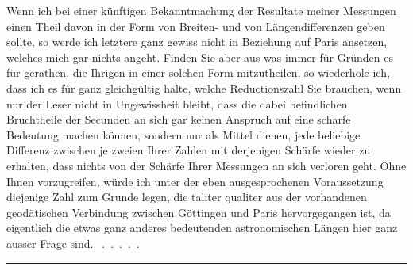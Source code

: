 \par\noindent\hspace*{\parindent}Wenn ich bei einer künftigen Bekanntmachung der Resultate meiner Messungen einen Theil davon in der Form von Breiten- und von Längendifferenzen geben sollte, so werde ich letztere ganz gewiss nicht in Beziehung auf Paris ansetzen, welches mich gar nichts angeht. Finden Sie aber aus was immer für Gründen es für gerathen, die Ihrigen in einer solchen Form mitzutheilen, so wiederhole ich, dass ich es für ganz gleichgültig halte, welche Reductionszahl Sie brauchen, wenn nur der Leser nicht in Ungewissheit bleibt, dass die dabei befindlichen Bruchtheile der Secunden an sich gar keinen Anspruch auf eine scharfe Bedeutung machen können, sondern nur als Mittel dienen, jede beliebige Differenz zwischen je zweien Ihrer Zahlen mit derjenigen Schärfe wieder zu erhalten, dass nichts von der Schärfe Ihrer Messungen an sich verloren geht. Ohne Ihnen vorzugreifen, würde ich unter der eben ausgesprochenen Voraussetzung diejenige Zahl zum Grunde legen, die taliter qualiter aus der vorhandenen geodätischen Verbindung zwischen Göttingen und Paris hervorgegangen ist, da eigentlich die etwas ganz anderes bedeutenden astronomischen Längen hier ganz ausser Frage sind.\quad\mbox{.\ .\ .\ .\ .\ .}
\begin{center}\rule{.12\linewidth}{.4pt}\end{center}

